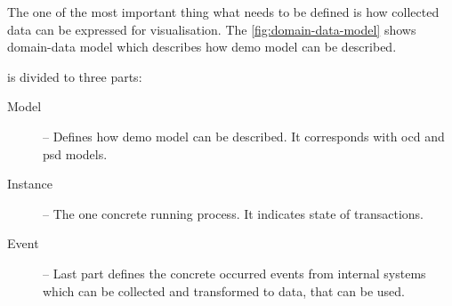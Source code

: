 The one of the most important thing what needs to be defined is how collected data can be expressed for visualisation. The \cref{fig:domain-data-model} shows domain-data model which describes how \gls{demo} model can be described.  

 is divided to three parts:
\begin{description}
\item[Model] -- Defines how \gls{demo} model can be described. It corresponds with \gls{ocd} and \gls{psd} models.
\item[Instance] -- The one concrete running process. It indicates state of transactions. 
\item[Event] -- Last part defines the concrete occurred events from internal systems which can be collected and transformed to data, that can be used. 
\end{description}

